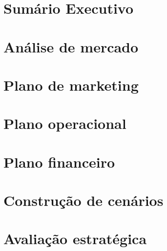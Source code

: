 \section{Sumário Executivo} %
\label{sec:sumario_executivo}


\section{Análise de mercado}
\label{sec:analise_de_mercado}


\section{Plano de marketing}
\label{sec:plano_de_marketing}
 

\section{Plano operacional}
\label{sec:plano_operacional}


\section{Plano financeiro}
\label{sec:plano_financeiro}


\section{Construção de cenários}
\label{sec:construcao_de_cenario}


\section{Avaliação estratégica}
\label{sec:avaliacao_estrategica}
